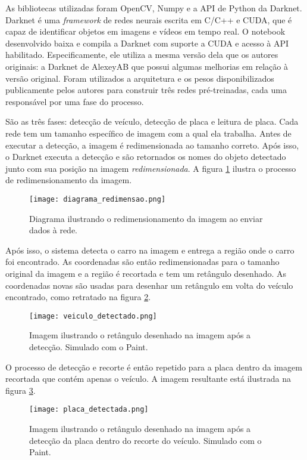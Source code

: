 \documentclass[conference]{IEEEtran}
\begin{document}
As bibliotecas utilizadas foram OpenCV, Numpy e a API de Python da Darknet.
Darknet é uma \textit{framework} de redes neurais escrita em C/C++ e CUDA, que é capaz de identificar objetos em imagens e vídeos em tempo real.
O notebook desenvolvido baixa e compila a Darknet com suporte a CUDA e acesso à API habilitado.
Especificamente, ele utiliza a mesma versão dela que os autores originais: a Darknet de AlexeyAB \cite{b3} que possui algumas melhorias em relação à versão original.
Foram utilizados a arquitetura e os pesos disponibilizados publicamente pelos autores\cite{b2} para construir três redes pré-treinadas, cada uma responsável por uma fase do processo.

São as três fases: detecção de veículo, detecção de placa e leitura de placa.
Cada rede tem um tamanho específico de imagem com a qual ela trabalha.
Antes de executar a detecção, a imagem é redimensionada ao tamanho correto.
Após isso, o Darknet executa a detecção e são retornados os nomes do objeto detectado junto com sua posição na imagem \emph{redimensionada}.
A figura \ref{fig:diagrama_redimensao} ilustra o processo de redimensionamento da imagem.

\begin{figure}
    \centering
    \texttt{[image: diagrama\_redimensao.png]}
    \caption{Diagrama ilustrando o redimensionamento da imagem ao enviar dados à rede.}
    \label{fig:diagrama_redimensao}
\end{figure}

Após isso, o sistema detecta o carro na imagem e entrega a região onde o carro foi encontrado. As coordenadas são então redimensionadas para o tamanho original da imagem e a região é recortada e tem um retângulo desenhado.
As coordenadas novas são usadas para desenhar um retângulo em volta do veículo encontrado, como retratado na figura \ref{fig:veiculo_detectado}.

\begin{figure}
    \centering
    \texttt{[image: veiculo\_detectado.png]}
    \caption{Imagem ilustrando o retângulo desenhado na imagem após a detecção. Simulado com o Paint.}
    \label{fig:veiculo_detectado}
\end{figure}

O processo de detecção e recorte é então repetido para a placa dentro da imagem recortada que contém apenas o veículo.
A imagem resultante está ilustrada na figura \ref{fig:placa_detectada}.

\begin{figure}
    \centering
    \texttt{[image: placa\_detectada.png]}
    \caption{Imagem ilustrando o retângulo desenhado na imagem após a detecção da placa dentro do recorte do veículo. Simulado com o Paint.}
    \label{fig:placa_detectada}
\end{figure}
\end{document}

